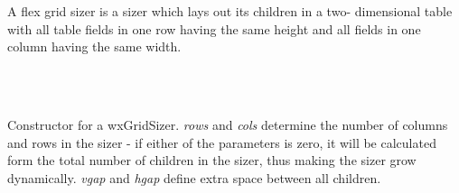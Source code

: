 \section{}\label{wxflexgridsizer}

A flex grid sizer is a sizer which lays out its children in a two-
dimensional table with all table fields in one row having the same 
height and all fields in one column having the same width.


\\
\\

\label{wxflexgridsizerwxflexgridsizer}



Constructor for a wxGridSizer. {\it rows} and {\it cols} determine the number of
columns and rows in the sizer - if either of the parameters is zero, it will be
calculated form the total number of children in the sizer, thus making the
sizer grow dynamically. {\it vgap} and {\it hgap} define extra space between
all children.


